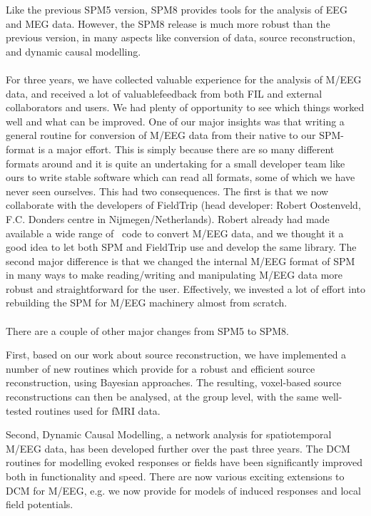 Like the previous SPM5 version, SPM8 provides tools for the analysis of EEG and MEG data. However, the SPM8 release is much more robust than the previous version, in many aspects like conversion of data, source reconstruction, and dynamic causal modelling.
\\
\\
For three years, we have collected valuable experience for the analysis of M/EEG data, and received a lot of valuablefeedback from both FIL and external collaborators and users. We had plenty of opportunity to see which things worked well and what can be improved. One of our major insights was that writing a general routine for conversion of M/EEG data from their native to our SPM-format is a major effort. This is simply because there are so many different formats around and it is quite an undertaking for a small developer team like ours to write stable software which can read all formats, some of which we have never seen ourselves. This had two consequences. The first is that we now collaborate with the developers of FieldTrip (head developer: Robert Oostenveld, F.C. Donders centre in Nijmegen/Netherlands). Robert already had made available a wide range of \matlab\ code to convert M/EEG data, and we thought it a good idea to let both SPM and FieldTrip use and develop the same library. The second major difference is that we changed the internal M/EEG format of SPM in many ways to make reading/writing and manipulating M/EEG data more robust and straightforward for the user. Effectively, we invested a lot of effort into rebuilding the SPM for M/EEG machinery almost from scratch.
\\
\\
There are a couple of other major changes from SPM5 to SPM8.

First, based on our work about source reconstruction, we have implemented a number of new routines which provide for a robust and efficient source reconstruction, using Bayesian approaches. The resulting, voxel-based source reconstructions can then be analysed, at the group level, with the same well-tested routines used for fMRI data.

Second, Dynamic Causal Modelling, a network analysis for spatiotemporal M/EEG data, has been developed further over the past three years. The DCM routines for modelling evoked responses or fields have been significantly improved both in functionality and speed. There are now various exciting extensions to DCM for M/EEG, e.g. we now provide for models of induced responses and local field potentials.

